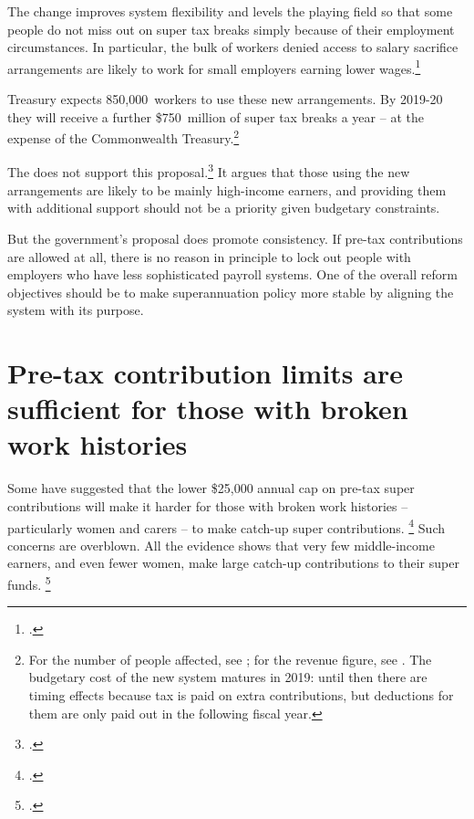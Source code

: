 \documentclass[continuous]{grattan}\usepackage[]{graphicx}\usepackage[]{color}
\begin{document}
The change improves system flexibility and levels the playing field so that some people do not miss out on super tax breaks simply because of their employment circumstances.
In particular, the bulk of workers denied access to salary sacrifice arrangements are likely to work for small employers earning lower wages.\footcite[][Table~13]{ABS-May-2014-Employee-earnings-and-hours} 

Treasury expects 850,000~workers to use these new arrangements. By 2019-20 they will receive a further \$750~million of super tax breaks a year -- at the expense of the Commonwealth Treasury.\footnote{%
  For the number of people affected, see \textcite[][5]{Budget-2016-17-Super-fact-sheets}; for the revenue figure, see \textcite[][25]{Budget-2016-17-Tax-Super}. The budgetary cost of the new system matures in 2019: until then there are timing effects because tax is paid on extra contributions, but deductions for them are only paid out in the following fiscal year.%
} 

The \ALP{} does not support this proposal.\footcite{Bowen-2016-Labors-plan-for-super-not-retrospective}
It argues that those using the new arrangements are likely to be mainly high-income earners, and providing them with additional support should not be a priority given budgetary constraints. 

But the government’s proposal does promote consistency. 
If pre-tax contributions are allowed at all, there is no reason in principle to lock out people with employers who have less sophisticated payroll systems.
One of the overall reform objectives should be to make superannuation policy more stable by aligning the system with its purpose.


\section{Pre-tax contribution limits are sufficient for those with broken work histories}\label{sec:pre-tax-contribution-limits-are-sufficient-for-broken-work-histories}

Some have suggested that the lower \$25,000 annual cap on pre-tax super contributions will make it harder for those with broken work histories -- particularly women and carers -- to make catch-up super contributions.%
\footcites{SMSF-Assoc-2016-Super-changes-cause-concern}{NATSEM-2016-Impact-of-201617-super-changes-by-gender-age} %
Such concerns are overblown. %
All the evidence shows that very few middle-income earners, and even fewer women, make large catch-up contributions to their super funds.%
\footcite{Grattan-submission-2016-Senate-Inq-econ-security-women-retirement} 
\end{document}
